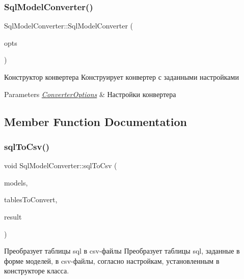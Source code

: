 \subsubsection{\texorpdfstring{Sql\+Model\+Converter()}{SqlModelConverter()}\hspace{0.1cm}{\footnotesize\ttfamily [2/2]}}
{\footnotesize\ttfamily Sql\+Model\+Converter\+::\+Sql\+Model\+Converter (\begin{DoxyParamCaption}\item[{\hyperlink{class_converter_options}{Converter\+Options}}]{opts }\end{DoxyParamCaption})}



Конструктор конвертера Конструирует конвертер с заданными настройками 


\begin{DoxyParams}{Parameters}
{\em \hyperlink{class_converter_options}{Converter\+Options}} & Настройки конвертера \\
\hline
\end{DoxyParams}


\subsection{Member Function Documentation}
\mbox{\label{class_sql_model_converter_a9cff9f1e0a7dfa36d0a34a8a3188f1ea}} 
\subsubsection{\texorpdfstring{sql\+To\+Csv()}{sqlToCsv()}}
{\footnotesize\ttfamily void Sql\+Model\+Converter\+::sql\+To\+Csv (\begin{DoxyParamCaption}\item[{const Q\+Vector$<$ Q\+Sql\+Table\+Model $\ast$$>$ \&}]{models,  }\item[{const Q\+String\+List \&}]{tables\+To\+Convert,  }\item[{Q\+Hash$<$ Q\+String, Q\+String $>$ \&}]{result }\end{DoxyParamCaption})}



Преобразует таблицы sql в csv-\/файлы Преобразует таблицы sql, заданные в форме моделей, в csv-\/файлы, согласно настройкам, установленным в конструкторе класса. 


